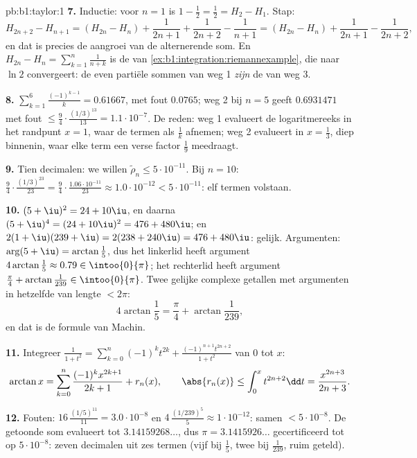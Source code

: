 \begin{solution}{pb:b1:taylor:1}
\textbf{7.} Inductie: voor $n = 1$ is $1 - \frac12 = \frac12 =
H_2 - H_1$. Stap:
\[
H_{2n+2} - H_{n+1} = (H_{2n} - H_n) + \frac{1}{2n+1} +
\frac{1}{2n+2} - \frac{1}{n+1}
= (H_{2n} - H_n) + \frac{1}{2n+1} - \frac{1}{2n+2},
\]
en dat is precies de aangroei van de alternerende som. En
$H_{2n} - H_n = \sum_{k=1}^{n}\frac{1}{n+k}$ is de  van
\cref{ex:b1:integration:riemannexample}, die naar $\ln 2$
convergeert: de even partiële sommen van weg 1 \emph{zijn} de
 van weg 3.

\textbf{8.} $\sum_{k=1}^{6}\frac{(-1)^{k-1}}{k} = 0.61667$, met
fout $0.0765$; weg 2 bij $n = 5$ geeft $0.6931471$ met fout
$\leq \frac94\cdot\frac{(1/3)^{13}}{13} = 1.1\cdot10^{-7}$. De
reden: weg 1 evalueert de logaritmereeks in het randpunt $x =
1$, waar de termen als $\frac1k$ afnemen; weg 2 evalueert in $x
= \frac13$, diep binnenin, waar elke term een verse factor
$\frac19$ meedraagt.

\textbf{9.} Tien decimalen: we willen $\tilde\rho_n \leq
5\cdot10^{-11}$. Bij $n = 10$: $\frac94 \cdot
\frac{(1/3)^{23}}{23} = \frac94\cdot\frac{1.06\cdot10^{-11}}{23}
\approx 1.0\cdot10^{-12} < 5\cdot10^{-11}$: elf termen
volstaan.

\textbf{10.} $(5+\iu)^2 = 24 + 10\iu$, en daarna $(5+\iu)^4 =
(24 + 10\iu)^2 = 476 + 480\iu$; en $2(1+\iu)(239+\iu) = 2(238 +
240\iu) = 476 + 480\iu$: gelijk. Argumenten: $\arg(5 + \iu) =
\arctan\frac15$, dus het linkerlid heeft argument
$4\arctan\frac15 \approx 0.79 \in \intoo{0}{\pi}$; het
rechterlid heeft argument $\frac\pi4 + \arctan\frac{1}{239} \in
\intoo{0}{\pi}$. Twee gelijke complexe getallen met argumenten
in hetzelfde  van lengte $< 2\pi$:
\[
4\arctan\frac15 = \frac\pi4 + \arctan\frac{1}{239} ,
\]
en dat is de formule van Machin.

\textbf{11.} Integreer $\frac{1}{1+t^2} = \sum_{k=0}^n (-1)^k
t^{2k} + \frac{(-1)^{n+1}t^{2n+2}}{1+t^2}$ van $0$ tot $x$:
\[
\arctan x = \sum_{k=0}^{n}\frac{(-1)^k x^{2k+1}}{2k+1} +
r_n(x),
\qquad
\abs{r_n(x)} \leq \int_0^x t^{2n+2}\dd t =
\frac{x^{2n+3}}{2n+3} .
\]

\textbf{12.} Fouten: $16\,\frac{(1/5)^{11}}{11} = 3.0\cdot
10^{-8}$ en $4\,\frac{(1/239)^5}{5} \approx 1\cdot10^{-12}$:
samen $< 5\cdot10^{-8}$. De getoonde som evalueert tot
$3.14159268\dots$, dus $\pi = 3.1415926\dots$ gecertificeerd tot
op $5\cdot10^{-8}$: zeven decimalen uit zes termen (vijf bij
$\frac15$, twee bij $\frac1{239}$, ruim geteld).


\end{solution}
